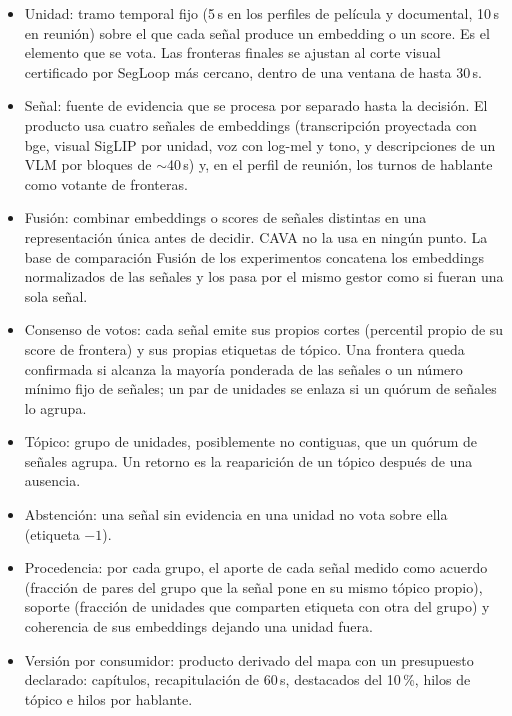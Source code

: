 \begin{itemize}
  \item Unidad: tramo temporal fijo (5\,s en los perfiles de película y documental, 10\,s en
        reunión) sobre el que cada señal produce un embedding o un score. Es el elemento que
        se vota. Las fronteras finales se ajustan al corte visual certificado por SegLoop más
        cercano, dentro de una ventana de hasta 30\,s.
  \item Señal: fuente de evidencia que se procesa por separado hasta la decisión. El producto
        usa cuatro señales de embeddings (transcripción proyectada con bge, visual SigLIP
        \cite{zhai2023siglip} por unidad, voz con log-mel y tono, y descripciones de un VLM
        \cite{bai2025qwen25vl} por bloques de $\sim$40\,s) y, en el perfil de reunión, los
        turnos de hablante como votante de fronteras.
  \item Fusión: combinar embeddings o scores de señales distintas en una representación única
        antes de decidir. CAVA no la usa en ningún punto. La base de comparación
        Fusión de los experimentos concatena los embeddings normalizados de las
        señales y los pasa por el mismo gestor como si fueran una sola señal.
  \item Consenso de votos: cada señal emite sus propios cortes (percentil propio de su score
        de frontera) y sus propias etiquetas de tópico. Una frontera queda confirmada si
        alcanza la mayoría ponderada de las señales o un número mínimo fijo de señales;
        un par de unidades se enlaza si un quórum de señales lo
        agrupa.
  \item Tópico: grupo de unidades, posiblemente no contiguas, que un quórum de señales
        agrupa. Un retorno es la reaparición de un tópico después de una ausencia.
  \item Abstención: una señal sin evidencia en una unidad no vota sobre ella (etiqueta $-1$).
  \item Procedencia: por cada grupo, el aporte de cada señal medido como acuerdo (fracción de
        pares del grupo que la señal pone en su mismo tópico propio), soporte (fracción de
        unidades que comparten etiqueta con otra del grupo) y coherencia de sus embeddings
        dejando una unidad fuera.
  \item Versión por consumidor: producto derivado del mapa con un presupuesto declarado:
        capítulos, recapitulación de 60\,s, destacados del 10\,\%, hilos de tópico e hilos
        por hablante.
\end{itemize}

